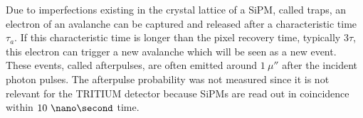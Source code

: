 
Due to imperfections existing in the crystal lattice of a SiPM, called traps, an electron of an avalanche can be captured and released after a characteristic time $\tau_a$. If this characteristic time is longer than the pixel recovery time, typically $3\tau$, this electron can trigger a new avalanche which will be seen as a new event. These events, called  afterpulses, are often emitted around $1~\mu\second$ after the incident photon pulses. The afterpulse probability was not measured since it is not relevant for the TRITIUM detector because SiPMs are read out in coincidence within $10~\nano\second$ time. 


